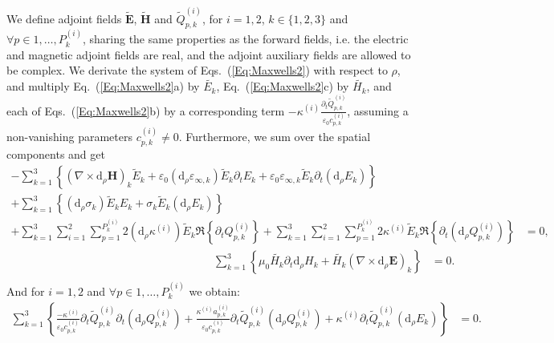 \documentclass[aps,prl,notitlepage, superscriptaddress,longbibliography]{revtex4-1}
\begin{document}
We define adjoint fields $\mathbf{\tilde{E}}$, $\mathbf{\tilde{H}}$ and $\tilde{Q}_{p, k}^{(i)}$, for $i =1,2$, $k\in\{1,2,3\}$ and $\forall p \in 1, \ldots, P_k^{(i)}$,
sharing the same properties as the forward fields, i.e. the electric and magnetic adjoint fields are real, and the adjoint auxiliary fields are allowed to be complex. 
We derivate the system of Eqs.~(\ref{Eq:Maxwells2}) with respect to $\rho$, and multiply Eq.~(\ref{Eq:Maxwells2}a) by $\tilde{E_k}$, Eq.~(\ref{Eq:Maxwells2}c) by $\tilde{H_k}$, and each of Eqs.~(\ref{Eq:Maxwells2}b) by a corresponding term $-\kappa^{(i)}\frac{\partial_{t}\tilde{Q}_{p, k}^{(i)}}{\varepsilon_{0} c_{p, k}^{(i)}}$, assuming a non-vanishing parameters $c_{p, k}^{(i)} \neq 0$. Furthermore, we sum over the spatial components and get
\begin{equation}\label{Eq:MaxwellsDerivE}
\begin{split}
-\sum_{k=1}^{3}\left\{(\nabla \times \mathrm{d}_{\rho}\mathbf{H})_{k}\tilde{E}_k 
+ \varepsilon_{0}(\mathrm{d}_{\rho}\varepsilon_{\infty, k})\tilde{E}_k \partial_{t}E_{k}
+ \varepsilon_{0}\varepsilon_{\infty, k}\tilde{E}_k \partial_{t}(\mathrm{d}_{\rho}E_{k})\right\} \;&\\[8pt]
+ \sum_{k=1}^{3}\left\{(\mathrm{d}_{\rho}\sigma_{k}) \tilde{E}_k E_{k}
+ \sigma_{k} \tilde{E}_k (\mathrm{d}_{\rho}E_{k})\right\}\;&\\[8pt]
+ \sum_{k=1}^{3}\sum_{i=1}^{2}\sum_{p=1}^{P_{k}^{(i)}}2(\mathrm{d}_{\rho}\kappa^{(i)})\tilde{E}_{k}\Re\left\{\partial_{t}Q_{p, k}^{(i)}\right\}  
+ \sum_{k=1}^{3}\sum_{i=1}^{2}\sum_{p=1}^{P_{k}^{(i)}}2\kappa^{(i)}\tilde{E}_{k}\Re\left\{\partial_{t}(\mathrm{d}_{\rho}Q_{p, k}^{(i)})\right\} &= 0,
\end{split}
\end{equation}
\begin{equation}\label{Eq:MaxwellsDerivH}
\begin{split}
\phantom{\;xxxxxxxxxxxxxxxxxxxxxxxxxxxxxxx}\sum_{k=1}^{3}\left\{\mu_0 \tilde{H_k}\partial_t \mathrm{d}_{\rho}H_k+ \tilde{H_k}(\nabla \times \mathrm{d}_{\rho}\mathbf{E})_k\right\} &=0.\\
\end{split}
\end{equation}
And for $i =1,2$ and $\forall p \in 1, \ldots, P_k^{(i)}$ we obtain:
\begin{equation}\label{Eq:MaxwellsDerivQ}
\begin{split}
\sum_{k=1}^{3}\left\{\frac{-\kappa^{(i)}}{\varepsilon_{0} c_{p, k}^{(i)}}\partial_{t}\tilde{Q}_{p, k}^{(i)}\partial_{t}(\mathrm{d}_{\rho}Q_{p, k}^{(i)})
+\frac{\kappa^{(i)} a_{p, k}^{(i)}}{\varepsilon_{0} c_{p, k}^{(i)}}\partial_{t}\tilde{Q}_{p, k}^{(i)} (\mathrm{d}_{\rho}Q_{p, k}^{(i)})
+\kappa^{(i)}\partial_{t}\tilde{Q}_{p, k}^{(i)}(\mathrm{d}_{\rho}E_{k})\right\} &= 0.
\end{split}
\end{equation}
\end{document}
